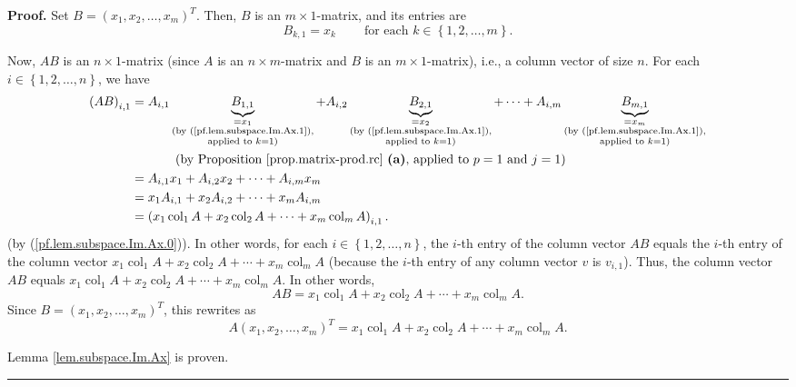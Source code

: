 \documentclass[numbers=enddot,12pt,final,onecolumn,notitlepage]{scrartcl}%
\theoremstyle{definition}
\newenvironment{proof}[1][Proof]{\noindent\textbf{#1.} }{\ \rule{0.5em}{0.5em}}
\begin{document}
\begin{proof}
Set $B=\left(  x_{1},x_{2},\ldots,x_{m}\right)  ^{T}$. Then, $B$ is an
$m\times1$-matrix, and its entries are%
\begin{equation}
B_{k,1}=x_{k}\ \ \ \ \ \ \ \ \ \ \text{for each }k\in\left\{  1,2,\ldots
,m\right\}  . \label{pf.lem.subspace.Im.Ax.1}%
\end{equation}


Now, $AB$ is an $n\times1$-matrix (since $A$ is an $n\times m$-matrix and $B$
is an $m\times1$-matrix), i.e., a column vector of size $n$. For each
$i\in\left\{  1,2,\ldots,n\right\}  $, we have%
\begin{align*}
\left(  AB\right)  _{i,1}  &  =A_{i,1}\underbrace{B_{1,1}}_{\substack{=x_{1}%
\\\text{(by (\ref{pf.lem.subspace.Im.Ax.1}),}\\\text{applied to }k=1\text{)}%
}}+A_{i,2}\underbrace{B_{2,1}}_{\substack{=x_{2}\\\text{(by
(\ref{pf.lem.subspace.Im.Ax.1}),}\\\text{applied to }k=1\text{)}}%
}+\cdots+A_{i,m}\underbrace{B_{m,1}}_{\substack{=x_{m}\\\text{(by
(\ref{pf.lem.subspace.Im.Ax.1}),}\\\text{applied to }k=1\text{)}}}\\
&  \ \ \ \ \ \ \ \ \ \ \left(  \text{by Proposition \ref{prop.matrix-prod.rc}
\textbf{(a)}, applied to }p=1\text{ and }j=1\right) \\
&  =A_{i,1}x_{1}+A_{i,2}x_{2}+\cdots+A_{i,m}x_{m}\\
&  =x_{1}A_{i,1}+x_{2}A_{i,2}+\cdots+x_{m}A_{i,m}\\
&  =\left(  x_{1}\operatorname*{col}\nolimits_{1}A+x_{2}\operatorname*{col}%
\nolimits_{2}A+\cdots+x_{m}\operatorname*{col}\nolimits_{m}A\right)  _{i,1}.
\end{align*}
(by (\ref{pf.lem.subspace.Im.Ax.0})). In other words, for each $i\in\left\{
1,2,\ldots,n\right\}  $, the $i$-th entry of the column vector $AB$ equals the
$i$-th entry of the column vector $x_{1}\operatorname*{col}\nolimits_{1}%
A+x_{2}\operatorname*{col}\nolimits_{2}A+\cdots+x_{m}\operatorname*{col}%
\nolimits_{m}A$ (because the $i$-th entry of any column vector $v$ is
$v_{i,1}$). Thus, the column vector $AB$ equals $x_{1}\operatorname*{col}%
\nolimits_{1}A+x_{2}\operatorname*{col}\nolimits_{2}A+\cdots+x_{m}%
\operatorname*{col}\nolimits_{m}A$. In other words,%
\[
AB=x_{1}\operatorname*{col}\nolimits_{1}A+x_{2}\operatorname*{col}%
\nolimits_{2}A+\cdots+x_{m}\operatorname*{col}\nolimits_{m}A.
\]
Since $B=\left(  x_{1},x_{2},\ldots,x_{m}\right)  ^{T}$, this rewrites as%
\[
A\left(  x_{1},x_{2},\ldots,x_{m}\right)  ^{T}=x_{1}\operatorname*{col}%
\nolimits_{1}A+x_{2}\operatorname*{col}\nolimits_{2}A+\cdots+x_{m}%
\operatorname*{col}\nolimits_{m}A.
\]


Lemma \ref{lem.subspace.Im.Ax} is proven.
\end{proof}
\end{document}

